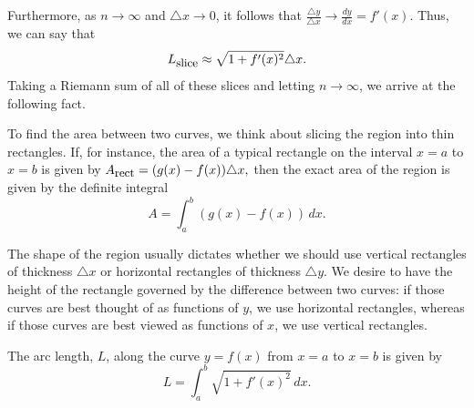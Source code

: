 Furthermore, as $n \to \infty$ and $\triangle x \to 0$, it follows that $\frac{\triangle y}{\triangle x} \to \frac{dy}{dx} = f'(x)$.  Thus, we can say that
$$L_{\mbox{\small{slice}}} \approx \sqrt{1 + f'(x)^2} \triangle x.$$
Taking a Riemann sum of all of these slices and letting $n \to \infty$, we arrive at the following fact.

\vspace*{5pt}
\nin {}
\vspace*{1pt}



\begin{summary}
  \item To find the area between two curves, we think about slicing the region into thin rectangles.  If, for instance, the area of a typical rectangle on the interval $x = a$ to $x = b$ is given by $A_{\mbox{\small{rect}}} = (g(x) - f(x)) \triangle x,$ then the exact area of the region is given by the definite integral
  $$A = \int_a^b (g(x)-f(x))\, dx.$$
  \item The shape of the region usually dictates whether we should use vertical rectangles of thickness $\triangle x$ or horizontal rectangles of thickness $\triangle y$.  We desire to have the height of the rectangle governed by the difference between two curves:  if those curves are best thought of as functions of $y$, we use horizontal rectangles, whereas if those curves are best viewed as functions of $x$, we use vertical rectangles.
  \item The arc length, $L$, along the curve $y = f(x)$ from $x = a$ to $x = b$ is given by
$$L = \int_a^b \sqrt{1 + f'(x)^2} \, dx.$$
\end{summary}

\nin \hrulefill

 

\clearpage
